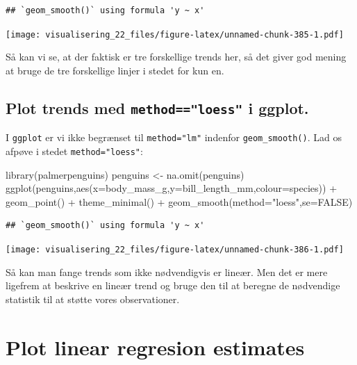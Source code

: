 \documentclass[
]{book}
\newenvironment{Shaded}{\begin{snugshade}}{\end{snugshade}}
\newcommand{\AttributeTok}[1]{\textcolor[rgb]{0.77,0.63,0.00}{#1}}
\newcommand{\ConstantTok}[1]{\textcolor[rgb]{0.00,0.00,0.00}{#1}}
\newcommand{\FunctionTok}[1]{\textcolor[rgb]{0.00,0.00,0.00}{#1}}
\newcommand{\NormalTok}[1]{#1}
\newcommand{\OtherTok}[1]{\textcolor[rgb]{0.56,0.35,0.01}{#1}}
\newcommand{\SpecialCharTok}[1]{\textcolor[rgb]{0.00,0.00,0.00}{#1}}
\newcommand{\StringTok}[1]{\textcolor[rgb]{0.31,0.60,0.02}{#1}}
\begin{document}
\begin{verbatim}
## `geom_smooth()` using formula 'y ~ x'
\end{verbatim}

\texttt{[image: visualisering\_22\_files/figure-latex/unnamed-chunk-385-1.pdf]}

Så kan vi se, at der faktisk er tre forskellige trends her, så det giver god mening at bruge de tre forskellige linjer i stedet for kun en.

\hypertarget{plot-trends-med-methodloess-i-ggplot.}{%
\subsection{\texorpdfstring{Plot trends med \texttt{method=="loess"} i ggplot.}{Plot trends med method=="loess" i ggplot.}}\label{plot-trends-med-methodloess-i-ggplot.}}

I \texttt{ggplot} er vi ikke begrænset til \texttt{method="lm"} indenfor \texttt{geom\_smooth()}. Lad os afpøve i stedet \texttt{method="loess"}:

\begin{Shaded}
\begin{Highlighting}[]
\FunctionTok{library}\NormalTok{(palmerpenguins)}
\NormalTok{penguins }\OtherTok{\textless{}{-}} \FunctionTok{na.omit}\NormalTok{(penguins)}
\FunctionTok{ggplot}\NormalTok{(penguins,}\FunctionTok{aes}\NormalTok{(}\AttributeTok{x=}\NormalTok{body\_mass\_g,}\AttributeTok{y=}\NormalTok{bill\_length\_mm,}\AttributeTok{colour=}\NormalTok{species)) }\SpecialCharTok{+} 
  \FunctionTok{geom\_point}\NormalTok{() }\SpecialCharTok{+} 
  \FunctionTok{theme\_minimal}\NormalTok{() }\SpecialCharTok{+} 
  \FunctionTok{geom\_smooth}\NormalTok{(}\AttributeTok{method=}\StringTok{"loess"}\NormalTok{,}\AttributeTok{se=}\ConstantTok{FALSE}\NormalTok{)}
\end{Highlighting}
\end{Shaded}

\begin{verbatim}
## `geom_smooth()` using formula 'y ~ x'
\end{verbatim}

\texttt{[image: visualisering\_22\_files/figure-latex/unnamed-chunk-386-1.pdf]}

Så kan man fange trends som ikke nødvendigvis er lineær. Men det er mere ligefrem at beskrive en lineær trend og bruge den til at beregne de nødvendige statistik til at støtte vores observationer.

\hypertarget{plot-linear-regresion-estimates}{%
\section{Plot linear regresion estimates}\label{plot-linear-regresion-estimates}}
\end{document}
